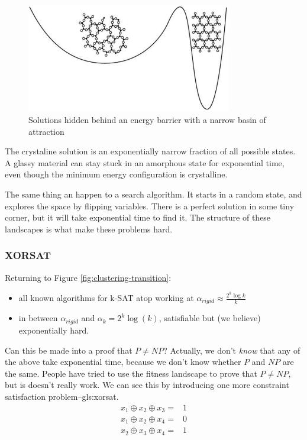 \documentclass[]{article}
\begin{document}
\begin{figure}[H]
	\begin{center}
		\caption[Solution hidden behind an energy barrier]{Solutions hidden behind an energy barrier with a narrow basin of attraction}\label{fig:glass}
		\includegraphics[width=0.8\textwidth]{glass}
	\end{center}
\end{figure}

The crystaline solution is an exponentially narrow fraction of all possible states. A glassy material can stay stuck in an amorphous state for exponential time, even though the minimum energy configuration is crystalline.

The same thing an happen to a search algorithm. It starts in a random state, and explores the space by flipping variables. There is a perfect solution in some tiny corner, but it will take exponential time to find it. The structure of these landscapes is what make these problems hard.

\subsubsection{XORSAT}

Returning to Figure \ref{fig:clustering-transition}:
\begin{itemize}
	\item all known algorithms for k-SAT atop working at $\alpha_{rigid}\approx \frac{2^k \log{k}}{k}$
	\item in between $\alpha_{rigid}$ and $\alpha_k=2^k \log(k)$, satisfiable but (we believe) exponentially hard.
\end{itemize}

Can this be made into a proof that $P\ne NP$? Actually, we don't \emph{know} that any of the above take exponential time, because we don't know whether $P$ and $NP$ are the same. People have tried to use the fitness landscape to prove that $P\ne NP$, but is doesn't really work. We can see this by introducing one more constraint satisfaction problem--\gls{gls:xorsat}.
\begin{align*}
	x_1 \oplus x_2 \oplus x_3 =& 1\\
	x_1 \oplus x_2 \oplus x_4 =& 0\\
	x_2 \oplus x_3 \oplus x_4 =& 1
\end{align*}
\end{document}
